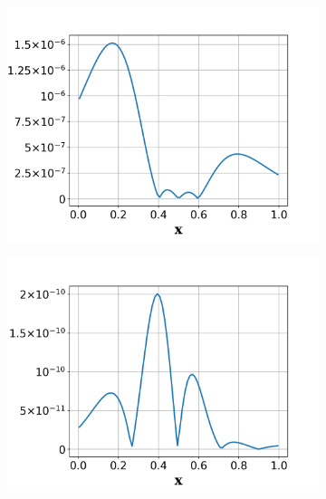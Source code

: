 \documentclass[a4paper]{article}
\begin{document}
\begin{figure}[!htbp]
  \centering
  \centering
  \begin{subfigure}{0.325\textwidth}
    \centering
    \includegraphics[width=1.0\linewidth]{figures/elem_J1error_indicator_p1.png}
    \label{fig:subsonic_J1_eta_p1}
  \end{subfigure}
  \begin{subfigure}{0.325\textwidth}
    \centering
    \includegraphics[width=1.0\linewidth]{figures/elem_J1error_indicator_p2.png}
    \label{fig:subsonic_J1_eta_p2}
  \end{subfigure}
  \begin{subfigure}{0.325\textwidth}

\end{subfigure}
\end{figure}
\end{document}
